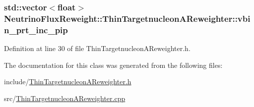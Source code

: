 \hypertarget{class_neutrino_flux_reweight_1_1_thin_targetnucleon_a_reweighter_a62d37535ba63cd757dcf40763a66d459}{
\subsubsection[{vbin\-\_\-prt\-\_\-inc\-\_\-pip}]{\setlength{\rightskip}{0pt plus 5cm}std\-::vector$<$float$>$ Neutrino\-Flux\-Reweight\-::\-Thin\-Targetnucleon\-A\-Reweighter\-::vbin\-\_\-prt\-\_\-inc\-\_\-pip}}\label{class_neutrino_flux_reweight_1_1_thin_targetnucleon_a_reweighter_a62d37535ba63cd757dcf40763a66d459}


Definition at line 30 of file Thin\-Targetnucleon\-A\-Reweighter.\-h.



The documentation for this class was generated from the following files\-:\begin{DoxyCompactItemize}
\item 
include/\hyperlink{_thin_targetnucleon_a_reweighter_8h}{Thin\-Targetnucleon\-A\-Reweighter.\-h}\item 
src/\hyperlink{_thin_targetnucleon_a_reweighter_8cpp}{Thin\-Targetnucleon\-A\-Reweighter.\-cpp}\end{DoxyCompactItemize}
